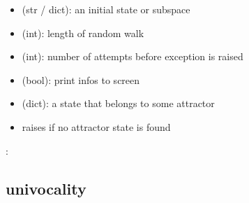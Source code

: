\documentclass[letterpaper,10pt,english]{sphinxmanual}
\begin{document}
\begin{fulllineitems}
\begin{description}
\begin{itemize}
\item {} 
 (str / dict): an initial state or subspace

\item {} 
 (int): length of random walk

\item {} 
 (int): number of attempts before exception is raised

\item {} 
 (bool): print infos to screen

\end{itemize}

\item[{\sphinxstylestrong{returns}:}] \leavevmode\begin{itemize}
\item {} 
 (dict): a state that belongs to some attractor

\item {} 
raises  if no attractor state is found

\end{itemize}

\end{description}

:

\begin{sphinxVerbatim}[commandchars=\\\{\}]
 
\end{sphinxVerbatim}

\end{fulllineitems}



\subsection{univocality}
\label{\detokenize{Attractors:univocality}}\label{\detokenize{Attractors:id4}}
\end{document}
